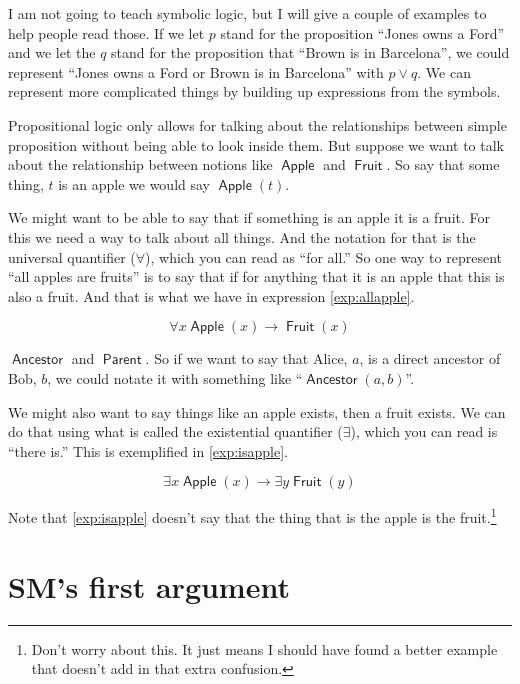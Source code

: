 \documentclass[12pt]{article}
\providecommand{\lor}{\vee}
\providecommand{\lif}{\rightarrow}
\providecommand{\lall}{\forall}
\providecommand{\lis}{\exists}
\newcommand{\rel}[1]{\ensuremath{\mathop{\mathsf{#1}}}}
\newcommand{\rlan}{\rel{Ancestor}}
\newcommand{\rlpt}{\rel{Parent}}
\newcommand{\rlapple}{\rel{Apple}}
\newcommand{\rlfruit}{\rel{Fruit}}
\begin{document}
I am not going to teach symbolic logic, but I will give a couple of examples to help people read those. If we let $p$ stand for the proposition “Jones owns a Ford” and we let the $q$ stand for the proposition that “Brown is in Barcelona”, we could represent “Jones owns a Ford or Brown is in Barcelona” with $p \lor q$.
We can represent more complicated things by building up expressions from the symbols.

Propositional logic only allows for talking about the relationships between simple proposition without being able to look inside them.
But suppose we want to talk about the relationship between notions like $\rlapple$ and $\rlfruit$. So say that some thing, $t$ is an apple we would say $\rlapple(t)$.

We might want to be able to say that if something is an apple it is a fruit.
For this we need a way to talk about all things. And the notation for that is the universal quantifier ($\lall$), which you can read as “for all.” So one way to represent “all apples are fruits” is to say that if for anything that it is an apple that this is also a fruit. And that is what we have in expression \ref{exp:allapple}.

\begin{equation}\label{exp:allapple}
    \lall x \rlapple(x) \lif \rlfruit(x)
\end{equation}

$\rlan$ and $\rlpt$. So if we want to say that Alice, $a$, is a direct ancestor of Bob, $b$, we could notate it with something like “$\rlan(a, b)$”.

We might also want to say things like an apple exists, then a fruit exists.
We can do that using what is called the existential quantifier ($\lis$), which you can read is “there is.” This is exemplified in \ref{exp:isapple}.

\begin{equation}\label{exp:isapple}
    \lis x \rlapple(x) \lif \lis y \rlfruit(y)
\end{equation}

Note that \ref{exp:isapple} doesn't say that the thing that is the apple is the fruit.\footnote{Don't worry about this. It just means I should have found a better example that doesn't add in that extra confusion.}

\section{SM's first argument}\label{sec:first}
\end{document}
